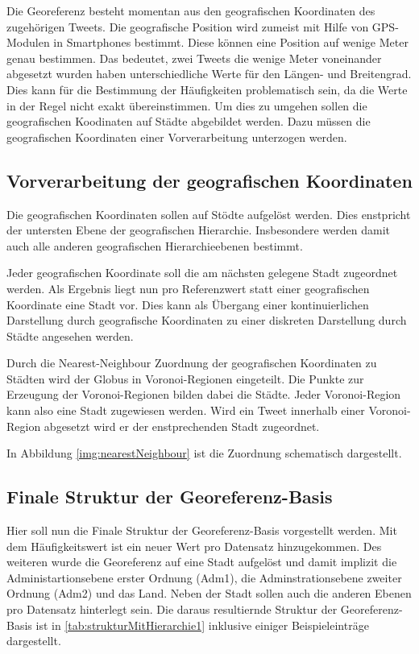 			Die Georeferenz besteht momentan aus den geografischen Koordinaten des zugehörigen Tweets.
			Die geografische Position wird zumeist mit Hilfe von GPS-Modulen in Smartphones bestimmt. 
			Diese können eine Position auf wenige Meter genau bestimmen.
			Das bedeutet, zwei Tweets die wenige Meter voneinander abgesetzt wurden haben unterschiedliche Werte für den Längen- und Breitengrad.
			Dies kann für die Bestimmung der Häufigkeiten problematisch sein, da die Werte in der Regel nicht exakt übereinstimmen.
			Um dies zu umgehen sollen die geografischen Koodinaten auf Städte abgebildet werden.
			Dazu müssen die geografischen Koordinaten einer Vorverarbeitung unterzogen werden.

		\subsection{Vorverarbeitung der geografischen Koordinaten}

			Die geografischen Koordinaten sollen auf Stödte aufgelöst werden.
			Dies enstpricht der untersten Ebene der geografischen Hierarchie.
			Insbesondere werden damit auch alle anderen geografischen Hierarchieebenen bestimmt.

			Jeder geografischen Koordinate soll die am nächsten gelegene Stadt zugeordnet werden.
			Als Ergebnis liegt nun pro Referenzwert statt einer geografischen Koordinate eine Stadt vor.
			Dies kann als Übergang einer kontinuierlichen Darstellung durch geografische Koordinaten zu einer diskreten Darstellung durch Städte angesehen werden. 
			
			Durch die Nearest-Neighbour Zuordnung der geografischen Koordinaten zu Städten wird der Globus in Voronoi-Regionen eingeteilt.
			Die Punkte zur Erzeugung der Voronoi-Regionen bilden dabei die Städte. 
			Jeder Voronoi-Region kann also eine Stadt zugewiesen werden.
			Wird ein Tweet innerhalb einer Voronoi-Region abgesetzt wird er der enstprechenden Stadt zugeordnet.

			In Abbildung \ref{img:nearestNeighbour} ist die Zuordnung schematisch dargestellt.


		\subsection{Finale Struktur der Georeferenz-Basis} 

			Hier soll nun die Finale Struktur der Georeferenz-Basis vorgestellt werden.
			Mit dem Häufigkeitswert ist ein neuer Wert pro Datensatz hinzugekommen.
			Des weiteren wurde die Georeferenz auf eine Stadt aufgelöst und damit implizit die Administartionsebene erster Ordnung (Adm1), die Adminstrationsebene zweiter Ordnung (Adm2) und das Land. 
			Neben der Stadt sollen auch die anderen Ebenen pro Datensatz hinterlegt sein.
			Die daraus resultiernde Struktur der Georeferenz-Basis ist in \ref{tab:strukturMitHierarchie1} inklusive einiger Beispieleinträge dargestellt.

